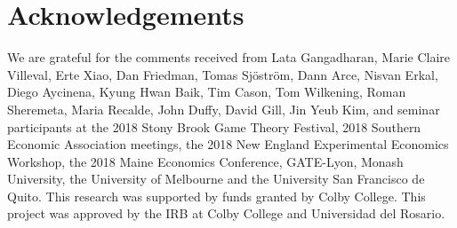 \documentclass[11pt, letterpaper]{article}
\theoremstyle{plain}
\begin{document}
\section{Acknowledgements}
We are grateful for the comments received from Lata Gangadharan, Marie Claire Villeval, Erte Xiao, Dan Friedman, Tomas Sj\"ostr\"om, Dann Arce, Nisvan Erkal, Diego Aycinena, Kyung Hwan Baik, Tim Cason, Tom Wilkening, Roman Sheremeta, Maria Recalde, John Duffy, David Gill, Jin Yeub Kim, and seminar participants at the 2018 Stony Brook Game Theory Festival, 2018 Southern Economic Association meetings, the 2018 New England Experimental Economics Workshop, the 2018 Maine Economics Conference, GATE-Lyon, Monash University, the University of Melbourne and the University San Francisco de Quito. This research was supported by funds granted by Colby College. This project was approved by the IRB at Colby College and Universidad del Rosario.
\end{document}
